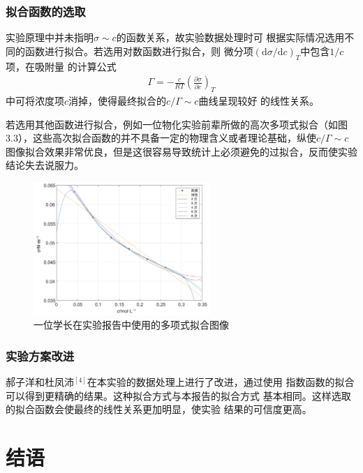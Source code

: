 \documentclass[12pt]{ctexart}
\numberwithin{equation}{section}
\begin{document}
\subsubsection{拟合函数的选取}

实验原理中并未指明$\sigma\sim c$的函数关系，故实验数据处理时可
根据实际情况选用不同的函数进行拟合。若选用对数函数进行拟合，则
微分项$(\mathrm{d}\sigma/\mathrm{d}c)_T$中包含$1/c$项，在吸附量
的计算公式
\begin{align}
    \Gamma = -\frac{c}{RT}
    \left(\frac{\partial\sigma}{\partial c}\right)_T
\end{align}
中可将浓度项$c$消掉，使得最终拟合的$c/\Gamma\sim c$曲线呈现较好
的线性关系。

若选用其他函数进行拟合，例如一位物化实验前辈所做的高次多项式拟合（如图3.3），这些高次拟合函数的并不具备一定的物理含义或者理论基础，纵使$c/\Gamma\sim c$图像拟合效果非常优良，但是这很容易导致统计上必须避免的过拟合，反而使实验结论失去说服力。

\begin{figure}[ht]
    \centering
    \includegraphics[width=0.6\textwidth]{example.png}
    \caption{一位学长在实验报告中使用的多项式拟合图像}
    \label{fig:example}
\end{figure}

\subsubsection{实验方案改进}

郝子洋和杜凤沛$^{[4]}$在本实验的数据处理上进行了改进，通过使用
指数函数的拟合可以得到更精确的结果。这种拟合方式与本报告的拟合方式
基本相同。这样选取的拟合函数会使最终的线性关系更加明显，使实验
结果的可信度更高。

\section{结语}
\end{document}
